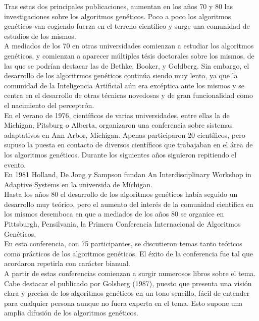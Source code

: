 \documentclass[12pt]{article} \usepackage[utf8x]{inputenc}
\begin{document}
Tras estas dos principales publicaciones, aumentan en los años 70 y 80 las 
investigaciones sobre los algoritmos genéticos. Poco a poco los algoritmos genéticos van
cogiendo fuerza en el terreno científico y surge una 
comunidad de estudios de los mismos.\\

A mediados de los 70 en otras universidades comienzan a estudiar los algoritmos genéticos,
y comienzan a aparecer múltiples tésis doctorales sobre los mismos, de las que se podrían 
destacar las de Bethke, Booker, y Goldberg. Sin embargo, el desarrollo de los algoritrmos 
genéticos continúa siendo muy lento, ya que la comunidad de la Inteligencia Artificial
aún era excéptica ante los mismos y se centra en el desarrollo de otras técnicas novedosas 
y de gran funcionalidad como el nacimiento del perceptrón.\\

En el verano de 1976, científicos de varias universidades, entre ellas la de Michigan, 
Pitsburg o  Alberta, organizaron una conferencia sobre sistemas adaptativos en Ann Arbor, 
Míchigan. Apenas participaron 20 científicos, pero supuso la puesta en contacto de diversos 
científicos que trabajaban en el área de los algoritmos genéticos. Durante los siguientes 
años siguieron repitiendo el evento.\\

En 1981 Holland, De Jong y Sampson fundan An Interdisciplinary Workshop in Adaptive Systems 
en la universida de Míchigan.\\


 Hasta los años 80 el desarrollo de los algoritmos genéticos
había seguido un desarrollo muy teórico, pero el aumento del interés de la comunidad científica 
en los mismos desemboca en que a mediados de los años 80  se organice
en Pittsburgh, Pensilvania, la Primera Conferencia Internacional de Algoritmos Genéticos.\\

En esta conferencia, con 75 participantes, se discutieron temas tanto teóricos como prácticos
de los algoritmos genéticos. El éxito de la conferencia fue tal que acordaron repetirla con 
carácter bianual.\\

A partir de estas conferencias comienzan a surgir numerosos libros sobre el tema. Cabe destacar
el publicado por Golsberg (1987), puesto que presenta una visión clara y precisa de los algoritmos
genéticos en un tono sencillo, fácil de entender para cualquier persona aunque no fuera experta
en el tema. Esto supone una amplia 
difusión de los algoritmos genéticos.\\
\end{document}
